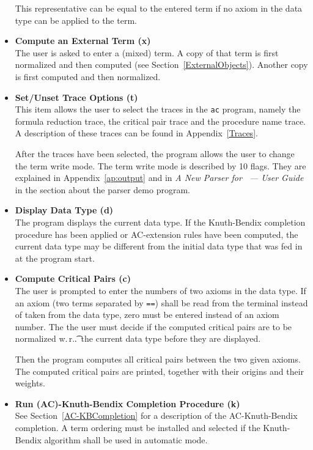 \begin{itemize}
This representative can be equal to the entered term if no axiom in
the data type can be applied to the term.

\item {\bf Compute an External Term (x)}\\
The user is asked to enter a (mixed) term. A copy of that term is
first normalized and then computed (see Section~\ref{ExternalObjects}).
Another copy is first computed and then normalized.

\item {\bf Set/Unset Trace Options (t)}\\
This item allows the user to select the traces in the {\tt ac} program,
namely the formula reduction trace, the critical pair trace and the 
procedure name trace. A description of these traces can be found in 
Appendix~\ref{Traces}.

After the traces have been selected, the program allows the user to
change the term write mode. The term write mode is described by 10
flags. 
They are explained in 
Appendix~\ref{ap:output} and in
{\em A New Parser for \redux\  --- User Guide}
in the section about the parser demo program. 

\item {\bf Display Data Type (d)}\\
The program displays the current data type. If the Knuth-Bendix
completion procedure has been applied or AC-extension rules have been
computed, the current data type may be different from the initial data
type that was fed in at the program start.

\item {\bf Compute Critical Pairs (c)}\\
The user is prompted to enter the numbers of two axioms in the data
type. If an axiom (two terms separated by {\tt ==}) shall be read from
the terminal instead of taken from the data type, zero must be entered
instead of an axiom number.  The the user must decide if the computed
critical pairs are to be normalized w.\,r.\t.\ the current data type
before they are displayed.

Then the program computes all critical pairs between the two given
axioms.
The computed critical pairs are printed, together with their origins and their
weights. 

\item {\bf Run (AC)-Knuth-Bendix Completion Procedure (k)}\\
See Section~\ref{AC-KBCompletion} for a description of the
AC-Knuth-Bendix completion. A term ordering must be installed and selected
if the Knuth-Bendix algorithm shall be used in automatic mode.        


\end{itemize}
